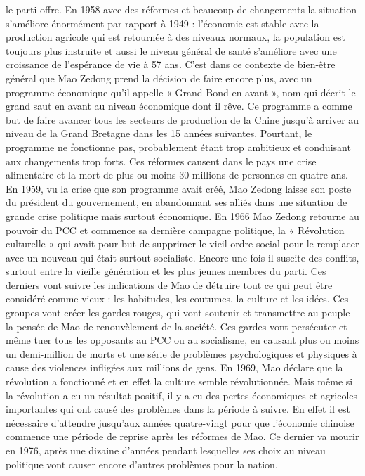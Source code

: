 le parti offre.  En 1958 avec des réformes et beaucoup de changements la situation s’améliore énormément par rapport à 1949 : l’économie est stable avec la production agricole qui est retournée à des niveaux normaux, la population est toujours plus instruite et aussi le niveau général de santé s’améliore avec une croissance de l’espérance de vie à 57 ans. C’est dans ce contexte de bien-être général que Mao Zedong prend la décision de faire encore plus, avec un programme économique qu’il appelle « Grand Bond en avant », nom qui décrit le grand saut en avant au niveau économique dont il rêve.  Ce programme a comme but de faire avancer tous les secteurs de production de la Chine jusqu’à arriver au niveau de la Grand Bretagne dans les 15 années suivantes. Pourtant, le programme ne fonctionne pas, probablement étant trop ambitieux et conduisant aux changements trop forts.  Ces réformes causent dans le pays une crise alimentaire et la mort de plus ou moins 30 millions de personnes en quatre ans.  En 1959, vu la crise que son programme avait créé, Mao Zedong laisse son poste du président du gouvernement, en abandonnant ses alliés dans une situation de grande crise politique mais surtout économique.  En 1966 Mao Zedong retourne au pouvoir du PCC et commence sa dernière campagne politique, la « Révolution culturelle » qui avait pour but de supprimer le vieil ordre social pour le remplacer avec un nouveau qui était surtout socialiste.  Encore une fois il suscite des conflits, surtout entre la vieille génération et les plus jeunes membres du parti. Ces derniers vont suivre les indications de Mao de détruire tout ce qui peut être considéré comme vieux : les habitudes, les coutumes, la culture et les idées. Ces groupes vont créer les gardes rouges, qui vont soutenir et transmettre au peuple la pensée de Mao de renouvèlement de la société. Ces gardes vont persécuter et même tuer tous les opposants au PCC ou au socialisme, en causant plus ou moins un demi-million de morts et une série de problèmes psychologiques et physiques à cause des violences infligées aux millions de gens.  En 1969, Mao déclare que la révolution a fonctionné et en effet la culture semble révolutionnée. Mais même si la révolution a eu un résultat positif, il y a eu des pertes économiques et agricoles importantes qui ont causé des problèmes dans la période à suivre. En effet il est nécessaire d’attendre jusqu’aux années quatre-vingt pour que l’économie chinoise commence une période de reprise après les réformes de Mao.  Ce dernier va mourir en 1976, après une dizaine d’années pendant lesquelles ses choix au niveau politique vont causer encore d’autres problèmes pour la nation.  
